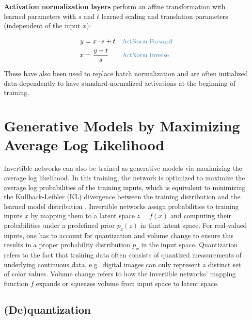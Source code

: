 \textbf{Activation normalization layers} perform an affine
transformation with learned parameters with $s$ and $t$ learned
scaling and translation parameters (independent of the input $x$):

\begin{align*}
    y&=x \cdot{s} + t && \codecomment{\text{ActNorm Forward}} \\
    x&=\frac{y - t}{s} && \codecomment{\text{ActNorm Inverse}} \\
\end{align*}

These have also been used to replace batch normalization and are often
initialized data-dependently to have standard-normalized activations at
the beginning of training.


\section{Generative Models by Maximizing Average Log
Likelihood}\label{generative-models-by-maximizing-average-log-likelihood}

    Invertible networks can also be trained as generative models via
maximizing the average log likelihood. In this training, the network is
optimized to maximize the average log probabilities of the training
inputs, which is equivalent to minimizing the Kullback-Leibler (KL)
divergence between the training distribution and the learned model
distribution \cite{DBLP:journals/corr/TheisOB15}. Invertible
networks assign probabilities to training inputs $x$ by mapping them
to a latent space $z=f(x)$ and computing their probabilities under a
predefined prior $p_z(z)$ in that latent space. For real-valued
inputs, one has to account for quantization and volume change to ensure
this results in a proper probability distribution $p_x$ in the input
space. Quantization refers to the fact that training data often consists
of quantized measurements of underlying continuous data, e.g.~digital
images can only represent a distinct set of color values. Volume change
refers to how the invertible networks' mapping function $f$ expands or
squeezes volume from input space to latent space.

\subsection{(De)quantization}\label{dequantization}
    
